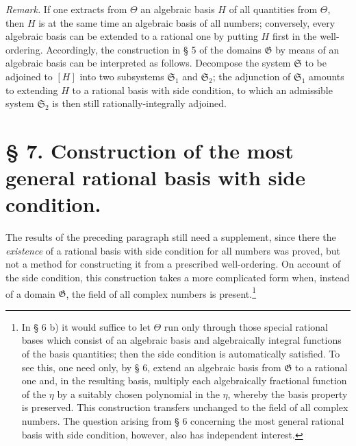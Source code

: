 \documentclass[11pt]{article}
\begin{document}
\emph{Remark.} If one extracts from $\Theta$ an algebraic basis $H$ of all
quantities from $\Theta$, then $H$ is at the same time an algebraic basis of all
numbers; conversely, every algebraic basis can be extended to a rational one by
putting $H$ first in the well-ordering. Accordingly, the construction in § 5 of
the domains $\mathfrak G$ by means of an algebraic basis can be interpreted as
follows. Decompose the system $\mathfrak S$ to be adjoined to $[H]$ into two
subsystems $\mathfrak S_1$ and $\mathfrak S_2$; the adjunction of
$\mathfrak S_1$ amounts to extending $H$ to a rational basis with side condition,
to which an admissible system $\mathfrak S_2$ is then still rationally-integrally
adjoined.

\section*{§ 7. Construction of the most general rational basis with side condition.}

The results of the preceding paragraph still need a supplement, since there the
\emph{existence} of a rational basis with side condition for all numbers was
proved, but not a method for constructing it from a prescribed well-ordering. On
account of the side condition, this construction takes a more complicated form
when, instead of a domain $\mathfrak G$, the field of all complex numbers is
present.\footnote{In § 6 b) it would suffice to let $\Theta$ run only through
those special rational bases which consist of an algebraic basis and
algebraically integral functions of the basis quantities; then the side condition
is automatically satisfied. To see this, one need only, by § 6, extend an
algebraic basis from $\mathfrak G$ to a rational one and, in the resulting basis,
multiply each algebraically fractional function of the $\eta$ by a suitably
chosen polynomial in the $\eta$, whereby the basis property is preserved. This
construction transfers unchanged to the field of all complex numbers. The
question arising from § 6 concerning the most general rational basis with side
condition, however, also has independent interest.}
\end{document}
